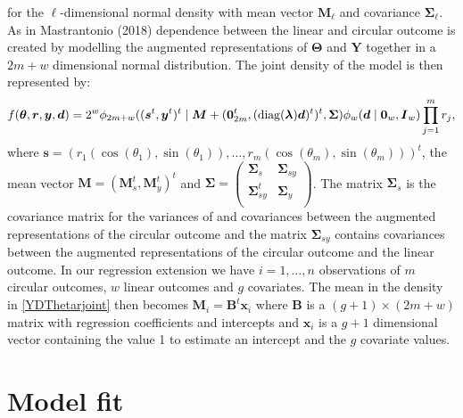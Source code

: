 \documentclass[12pt,]{article}
\begin{document}
for the \(\ell\)-dimensional normal density with mean vector
\(\boldsymbol{M}_\ell\) and covariance \(\boldsymbol{\Sigma}_\ell\). As
in Mastrantonio (2018) dependence between the linear and circular
outcome is created by modelling the augmented representations of
\(\boldsymbol{\Theta}\) and \(\boldsymbol{Y}\) together in a \(2m + w\)
dimensional normal distribution. The joint density of the model is then
represented by: \begin{equation}\label{YDThetarjoint} 
f(\boldsymbol{\theta}, \boldsymbol{r},
\boldsymbol{y}, \boldsymbol{d}) = 2^w\phi_{2m+w}((\boldsymbol{s}^t,
\boldsymbol{y}^t)^t \mid \boldsymbol{M} + (\boldsymbol{0}_{2m}^t, ({\rm
diag}(\boldsymbol{\lambda})\boldsymbol{d})^t)^t, \boldsymbol{\Sigma})
\phi_w(\boldsymbol{d} \mid \boldsymbol{0}_w, \boldsymbol{I}_w) \prod_{j =
1}^{m}r_j, 
\end{equation} \noindent where
\(\boldsymbol{s} = (r_1(\cos(\theta_1), \sin(\theta_1)), \dots, r_m(\cos(\theta_m), \sin(\theta_m)))^t\),
the mean vector
\(\boldsymbol{M} = (\boldsymbol{M}_s^t, \boldsymbol{M}_y^t)^t\) and
\(\boldsymbol{\Sigma} = \left ( \begin{matrix} \boldsymbol{\Sigma}_s & \boldsymbol{\Sigma}_{sy} \\ \boldsymbol{\Sigma}_{sy}^t & \boldsymbol{\Sigma}_y \\ \end{matrix} \right )\).
The matrix \(\boldsymbol{\Sigma}_s\) is the covariance matrix for the
variances of and covariances between the augmented representations of
the circular outcome and the matrix \(\boldsymbol{\Sigma}_{sy}\)
contains covariances between the augmented representations of the
circular outcome and the linear outcome. \newline \indent In our
regression extension we have \(i = 1, \dots, n\) observations of \(m\)
circular outcomes, \(w\) linear outcomes and \(g\) covariates. The mean
in the density in \eqref{YDThetarjoint} then becomes
\(\boldsymbol{M}_i = \boldsymbol{B}^t\boldsymbol{x}_i\) where
\(\boldsymbol{B}\) is a \((g + 1) \times (2m + w)\) matrix with
regression coefficients and intercepts and \(\boldsymbol{x}_i\) is a
\(g + 1\) dimensional vector containing the value 1 to estimate an
intercept and the \(g\) covariate values. \newline

\section{Model fit}
\end{document}
